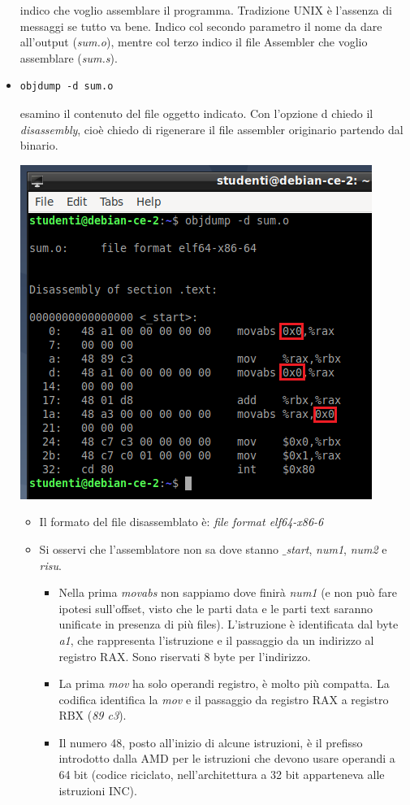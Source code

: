 \begin{itemize}
	indico che voglio assemblare il programma. Tradizione UNIX è l'assenza di messaggi se tutto va bene. Indico col secondo parametro il nome da dare all'output (\emph{sum.o}), mentre col terzo indico il file Assembler che voglio assemblare (\emph{sum.s}). 
	\item \begin{verbatim}objdump -d sum.o\end{verbatim}
	esamino il contenuto del file oggetto indicato. Con l'opzione d chiedo il \emph{disassembly}, cioè chiedo di rigenerare il file assembler originario partendo dal binario. \begin{center}
		\includegraphics{img/140.PNG}
	\end{center}
	\begin{itemize}
		\item Il formato del file disassemblato è: \emph{file format elf64-x86-6}
		\item Si osservi che l'assemblatore non sa dove stanno \emph{$\_$start}, \emph{num1}, \emph{num2} e \emph{risu}.
		\begin{itemize}
			\item Nella prima \emph{movabs} non sappiamo dove finirà \emph{num1} (e non può fare ipotesi sull'offset, visto che le parti data e le parti text saranno unificate in presenza di più files). L'istruzione è identificata dal byte \emph{a1}, che rappresenta l'istruzione e il passaggio da un indirizzo al registro RAX. Sono riservati 8 byte per l'indirizzo.
			\item La prima \emph{mov} ha solo operandi registro, è molto più compatta. La codifica identifica la \emph{mov} e il passaggio da registro RAX a registro RBX (\emph{89 c3}).
			\item Il numero 48, posto all'inizio di alcune istruzioni, è il prefisso introdotto dalla AMD per le istruzioni che devono usare operandi a 64 bit (codice riciclato, nell'architettura a 32 bit apparteneva alle istruzioni INC).
			

\end{itemize}
\end{itemize}
\end{itemize}
